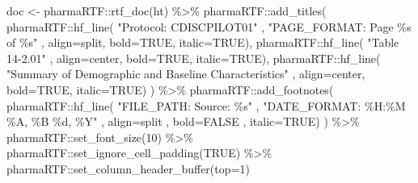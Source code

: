 \documentclass[
  letterpaper,
  DIV=11,
  numbers=noendperiod]{scrreprt}
\newenvironment{Shaded}{\begin{snugshade}}{\end{snugshade}}
\newcommand{\AttributeTok}[1]{\textcolor[rgb]{0.40,0.45,0.13}{#1}}
\newcommand{\ConstantTok}[1]{\textcolor[rgb]{0.56,0.35,0.01}{#1}}
\newcommand{\DecValTok}[1]{\textcolor[rgb]{0.68,0.00,0.00}{#1}}
\newcommand{\FunctionTok}[1]{\textcolor[rgb]{0.28,0.35,0.67}{#1}}
\newcommand{\NormalTok}[1]{\textcolor[rgb]{0.00,0.23,0.31}{#1}}
\newcommand{\OtherTok}[1]{\textcolor[rgb]{0.00,0.23,0.31}{#1}}
\newcommand{\SpecialCharTok}[1]{\textcolor[rgb]{0.37,0.37,0.37}{#1}}
\newcommand{\StringTok}[1]{\textcolor[rgb]{0.13,0.47,0.30}{#1}}
\begin{document}
\begin{Shaded}
\begin{Highlighting}[]
\NormalTok{doc }\OtherTok{\textless{}{-}}\NormalTok{ pharmaRTF}\SpecialCharTok{::}\FunctionTok{rtf\_doc}\NormalTok{(ht) }\SpecialCharTok{\%\textgreater{}\%} 
\NormalTok{  pharmaRTF}\SpecialCharTok{::}\FunctionTok{add\_titles}\NormalTok{(}
\NormalTok{    pharmaRTF}\SpecialCharTok{::}\FunctionTok{hf\_line}\NormalTok{( }\StringTok{"Protocol: CDISCPILOT01"}
\NormalTok{                       , }\StringTok{"PAGE\_FORMAT: Page \%s of \%s"}
\NormalTok{                       , }\AttributeTok{align=}\StringTok{\textquotesingle{}split\textquotesingle{}}\NormalTok{, }\AttributeTok{bold=}\ConstantTok{TRUE}\NormalTok{, }\AttributeTok{italic=}\ConstantTok{TRUE}\NormalTok{),}
\NormalTok{    pharmaRTF}\SpecialCharTok{::}\FunctionTok{hf\_line}\NormalTok{( }\StringTok{"Table 14{-}2.01"}
\NormalTok{                       , }\AttributeTok{align=}\StringTok{\textquotesingle{}center\textquotesingle{}}\NormalTok{, }\AttributeTok{bold=}\ConstantTok{TRUE}\NormalTok{, }\AttributeTok{italic=}\ConstantTok{TRUE}\NormalTok{),}
\NormalTok{    pharmaRTF}\SpecialCharTok{::}\FunctionTok{hf\_line}\NormalTok{( }\StringTok{"Summary of Demographic and Baseline Characteristics"}
\NormalTok{                       , }\AttributeTok{align=}\StringTok{\textquotesingle{}center\textquotesingle{}}\NormalTok{, }\AttributeTok{bold=}\ConstantTok{TRUE}\NormalTok{, }\AttributeTok{italic=}\ConstantTok{TRUE}\NormalTok{)}
\NormalTok{  ) }\SpecialCharTok{\%\textgreater{}\%} 
\NormalTok{  pharmaRTF}\SpecialCharTok{::}\FunctionTok{add\_footnotes}\NormalTok{(}
\NormalTok{    pharmaRTF}\SpecialCharTok{::}\FunctionTok{hf\_line}\NormalTok{( }\StringTok{"FILE\_PATH: Source: \%s"}
\NormalTok{                       , }\StringTok{"DATE\_FORMAT: \%H:\%M \%A, \%B \%d, \%Y"}
\NormalTok{                       , }\AttributeTok{align=}\StringTok{\textquotesingle{}split\textquotesingle{}}
\NormalTok{                       , }\AttributeTok{bold=}\ConstantTok{FALSE}
\NormalTok{                       , }\AttributeTok{italic=}\ConstantTok{TRUE}\NormalTok{)}
\NormalTok{  ) }\SpecialCharTok{\%\textgreater{}\%} 
\NormalTok{  pharmaRTF}\SpecialCharTok{::}\FunctionTok{set\_font\_size}\NormalTok{(}\DecValTok{10}\NormalTok{) }\SpecialCharTok{\%\textgreater{}\%}
\NormalTok{  pharmaRTF}\SpecialCharTok{::}\FunctionTok{set\_ignore\_cell\_padding}\NormalTok{(}\ConstantTok{TRUE}\NormalTok{) }\SpecialCharTok{\%\textgreater{}\%} 
\NormalTok{  pharmaRTF}\SpecialCharTok{::}\FunctionTok{set\_column\_header\_buffer}\NormalTok{(}\AttributeTok{top=}\DecValTok{1}\NormalTok{)}


\end{Highlighting}
\end{Shaded}
\end{document}
